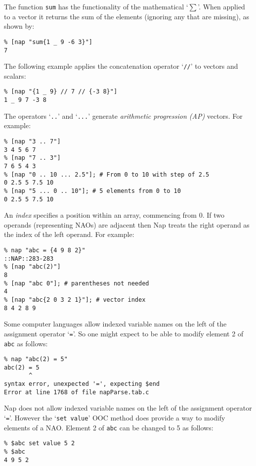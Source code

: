 The function 
  \texttt{sum} has the functionality of the mathematical
  `$\sum$'. When applied to a vector it returns the sum of
  the elements (ignoring any that are missing), as shown by:
  \begin{verbatim}
% [nap "sum{1 _ 9 -6 3}"]
7
\end{verbatim}

  

The following example applies the concatenation operator `\texttt{//}' to vectors and scalars:
  \begin{verbatim}
% [nap "{1 _ 9} // 7 // {-3 8}"]
1 _ 9 7 -3 8
\end{verbatim}

  

The operators `\texttt{..}' and `\texttt{...}' generate 
  \emph{arithmetic progression (AP)} vectors. For example:
  \begin{verbatim}
% [nap "3 .. 7"]
3 4 5 6 7
% [nap "7 .. 3"]
7 6 5 4 3
% [nap "0 .. 10 ... 2.5"]; # From 0 to 10 with step of 2.5
0 2.5 5 7.5 10
% [nap "5 ... 0 .. 10"]; # 5 elements from 0 to 10
0 2.5 5 7.5 10
\end{verbatim}

  

An 
  \emph{index} specifies a position within an array, commencing from
  0. If two operands (representing NAOs) are adjacent then Nap treats
  the right operand as the index of the left operand. For example:
  \begin{verbatim}
% nap "abc = {4 9 8 2}"
::NAP::283-283
% [nap "abc(2)"]
8
% [nap "abc 0"]; # parentheses not needed
4
% [nap "abc{2 0 3 2 1}"]; # vector index
8 4 2 8 9
\end{verbatim}

  

Some computer languages allow indexed variable names on the left
  of the assignment operator `\texttt{=}'. So one might expect to be able to modify
  element 2 of 
  \texttt{abc} as follows:
  \begin{verbatim}
% nap "abc(2) = 5"
abc(2) = 5
       ^
syntax error, unexpected '=', expecting $end
Error at line 1768 of file napParse.tab.c
\end{verbatim}

  

Nap does not allow indexed variable names on the left of the
  assignment operator `\texttt{=}'. However the `\texttt{set value}' OOC method does provide a way to modify
  elements of a NAO. Element 2 of 
  \texttt{abc} can be changed to 5 as follows:
  \begin{verbatim}
% $abc set value 5 2
% $abc
4 9 5 2
\end{verbatim}


